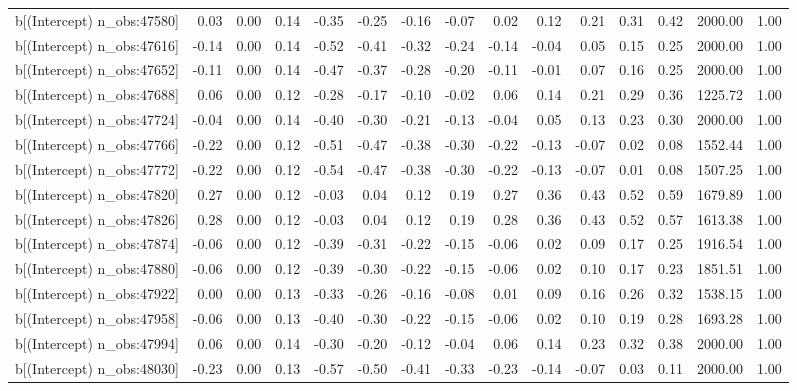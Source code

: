 \begin{table}[ht]
\begin{tabular}{rrrrrrrrrrrrrrr}
  b[(Intercept) n\_obs:47580] & 0.03 & 0.00 & 0.14 & -0.35 & -0.25 & -0.16 & -0.07 & 0.02 & 0.12 & 0.21 & 0.31 & 0.42 & 2000.00 & 1.00 \\ 
  b[(Intercept) n\_obs:47616] & -0.14 & 0.00 & 0.14 & -0.52 & -0.41 & -0.32 & -0.24 & -0.14 & -0.04 & 0.05 & 0.15 & 0.25 & 2000.00 & 1.00 \\ 
  b[(Intercept) n\_obs:47652] & -0.11 & 0.00 & 0.14 & -0.47 & -0.37 & -0.28 & -0.20 & -0.11 & -0.01 & 0.07 & 0.16 & 0.25 & 2000.00 & 1.00 \\ 
  b[(Intercept) n\_obs:47688] & 0.06 & 0.00 & 0.12 & -0.28 & -0.17 & -0.10 & -0.02 & 0.06 & 0.14 & 0.21 & 0.29 & 0.36 & 1225.72 & 1.00 \\ 
  b[(Intercept) n\_obs:47724] & -0.04 & 0.00 & 0.14 & -0.40 & -0.30 & -0.21 & -0.13 & -0.04 & 0.05 & 0.13 & 0.23 & 0.30 & 2000.00 & 1.00 \\ 
  b[(Intercept) n\_obs:47766] & -0.22 & 0.00 & 0.12 & -0.51 & -0.47 & -0.38 & -0.30 & -0.22 & -0.13 & -0.07 & 0.02 & 0.08 & 1552.44 & 1.00 \\ 
  b[(Intercept) n\_obs:47772] & -0.22 & 0.00 & 0.12 & -0.54 & -0.47 & -0.38 & -0.30 & -0.22 & -0.13 & -0.07 & 0.01 & 0.08 & 1507.25 & 1.00 \\ 
  b[(Intercept) n\_obs:47820] & 0.27 & 0.00 & 0.12 & -0.03 & 0.04 & 0.12 & 0.19 & 0.27 & 0.36 & 0.43 & 0.52 & 0.59 & 1679.89 & 1.00 \\ 
  b[(Intercept) n\_obs:47826] & 0.28 & 0.00 & 0.12 & -0.03 & 0.04 & 0.12 & 0.19 & 0.28 & 0.36 & 0.43 & 0.52 & 0.57 & 1613.38 & 1.00 \\ 
  b[(Intercept) n\_obs:47874] & -0.06 & 0.00 & 0.12 & -0.39 & -0.31 & -0.22 & -0.15 & -0.06 & 0.02 & 0.09 & 0.17 & 0.25 & 1916.54 & 1.00 \\ 
  b[(Intercept) n\_obs:47880] & -0.06 & 0.00 & 0.12 & -0.39 & -0.30 & -0.22 & -0.15 & -0.06 & 0.02 & 0.10 & 0.17 & 0.23 & 1851.51 & 1.00 \\ 
  b[(Intercept) n\_obs:47922] & 0.00 & 0.00 & 0.13 & -0.33 & -0.26 & -0.16 & -0.08 & 0.01 & 0.09 & 0.16 & 0.26 & 0.32 & 1538.15 & 1.00 \\ 
  b[(Intercept) n\_obs:47958] & -0.06 & 0.00 & 0.13 & -0.40 & -0.30 & -0.22 & -0.15 & -0.06 & 0.02 & 0.10 & 0.19 & 0.28 & 1693.28 & 1.00 \\ 
  b[(Intercept) n\_obs:47994] & 0.06 & 0.00 & 0.14 & -0.30 & -0.20 & -0.12 & -0.04 & 0.06 & 0.14 & 0.23 & 0.32 & 0.38 & 2000.00 & 1.00 \\ 
  b[(Intercept) n\_obs:48030] & -0.23 & 0.00 & 0.13 & -0.57 & -0.50 & -0.41 & -0.33 & -0.23 & -0.14 & -0.07 & 0.03 & 0.11 & 2000.00 & 1.00 \\ 

\end{tabular}
\end{table}
